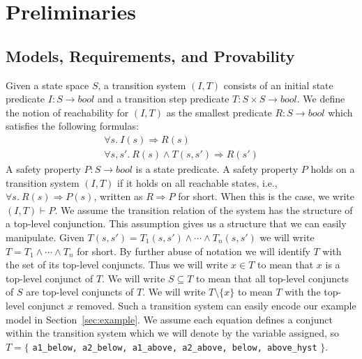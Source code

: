 \section{Preliminaries}
\label{sec:background}
\newcommand{\satisfies}{\vdash_{\!\!s}}
\newcommand{\nsatisfies}{\nvdash_{\!\!s}}
\newcommand{\bool}[0]{\mathit{bool}}
\newcommand{\reach}[0]{\mathit{R}}
\newcommand{\ite}[3]{\mathit{if}\ {#1}\ \mathit{then}\ {#2}\ \mathit{else}\ {#3}}
\newcommand{\nondetcov}{\text{\sc Nondet-Cov}}
\newcommand{\mutcov}{\text{\sc Mutant-Cov}}

\subsection{Models, Requirements, and Provability}

Given a state space $S$, a transition system $(I,T)$ consists of an
initial state predicate $I : S \to \bool$ and a transition step
predicate $T : S \times S \to \bool$. We define the notion of
reachability for $(I, T)$ as the smallest predicate $\reach : S \to
\bool$ which satisfies the following formulas:
\begin{gather*}
  \forall s.~ I(s) \Rightarrow \reach(s) \\
  \forall s, s'.~ \reach(s) \land T(s, s') \Rightarrow \reach(s')
\end{gather*}
A safety property $P : S \to \bool$ is a state predicate. A safety
property $P$ holds on a transition system $(I, T)$ if it holds on all
reachable states, i.e., $\forall s.~ \reach(s) \Rightarrow P(s)$,
written as $\reach \Rightarrow P$ for short. When this is the case, we
write $(I, T)\vdash P$.
We assume the transition relation of the system has the structure of a top-level conjunction. This assumption gives us a structure that we can easily manipulate. Given $T(s, s') = T_1(s, s') \land \cdots \land T_n(s, s')$ we will write $T = T_1 \land \cdots \land T_n$ for short.
By further abuse of notation we will identify
$T$ with the set of its top-level conjuncts. Thus we will write $x \in
T$ to mean that $x$ is a top-level conjunct of $T$. We will write $S
\subseteq T$ to mean that all top-level conjuncts of $S$ are top-level
conjuncts of $T$.
We will write $T \setminus \{x\}$ to mean $T$
with the top-level conjunct $x$ removed. Such a transition system can easily encode our example model in Section~\ref{sec:example}.  We assume each equation defines a conjunct within the transition system which we will denote by the variable assigned, so $T = \{$ {\small \texttt{a1\_below, a2\_below, a1\_above, a2\_above, below, above\_hyst}} $\}$.

